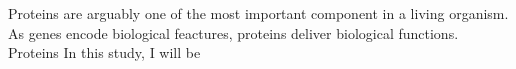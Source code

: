 Proteins are arguably one of the most important component in a living organism. As genes encode biological feactures, proteins deliver biological functions. Proteins In this study, I will be 